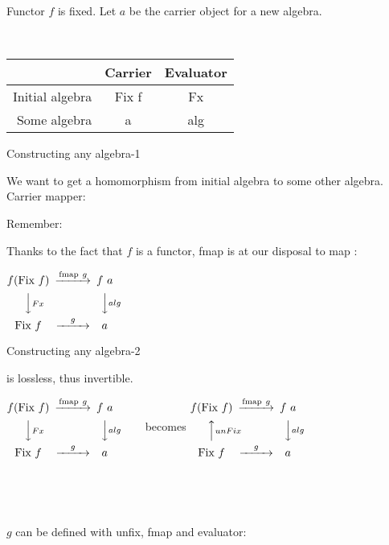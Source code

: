 \documentclass{beamer}
\newcommand{\hin}[2]{}
\begin{document}
\begin{frame}[fragile]

Functor $f$ is fixed. Let $a$ be the carrier object for a new algebra.

~

\begin{tabular}{r | c | c}
 ~ & Carrier & Evaluator\\\hline
Initial algebra&   Fix f & Fx\\\hline
Some algebra &     a & alg \\
\end{tabular}

\end{frame}

\begin{frame}[fragile]{Constructing any algebra-1}


We want to get a homomorphism from initial algebra to some other algebra. Carrier mapper:


Remember: \hin{16}{16}


Thanks to the fact that $f$ is a functor, fmap is at our disposal to map : 


\begin{center}
$
\begin{CD}
f (\text{Fix} \ f) @>\text{fmap} \ g>> f\ a\\
@VVFxV @VValgV\\
\text{Fix} \ f @>g>> a
\end{CD}
$

\end{center}
\end{frame}


\begin{frame}[fragile]{Constructing any algebra-2}

 is lossless, thus invertible.

\hin{106}{107}

$
\begin{CD}
f (\text{Fix} \ f) @>\text{fmap} \ g>> f\ a\\
@VVFxV @VValgV\\
\text{Fix} \ f @>g>> a
\end{CD}
$
~~~~~becomes 
$
\begin{CD}
f (\text{Fix} \ f) @>\text{fmap} \ g>> f\ a\\
@AAunFixA @VValgV\\
\text{Fix} \ f @>g>> a
\end{CD}
$

~

~

$g$ can be defined with unfix, fmap and evaluator:

\hin{110}{110}
\end{frame}
\end{document}
